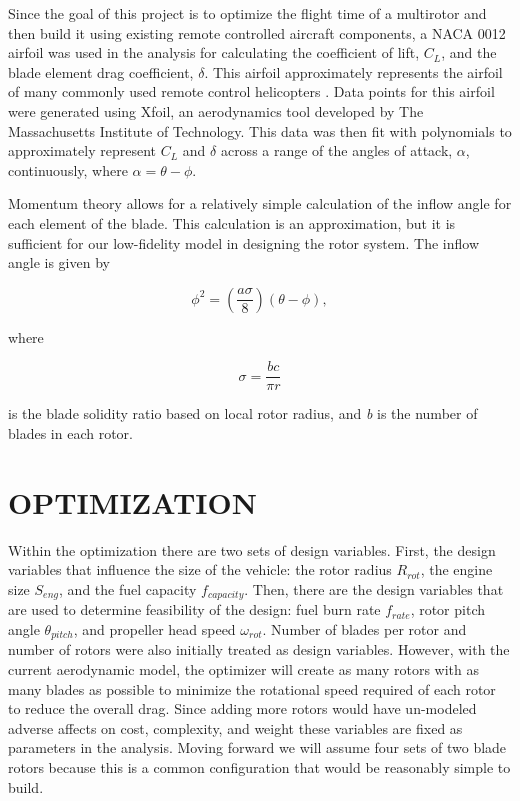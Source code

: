 \documentclass[letterpaper, 10 pt, conference]{ieeeconf}  %
\begin{document}
Since the goal of this project is to optimize the flight time of a multirotor and then build it using existing remote controlled aircraft components, a NACA 0012 airfoil was used in the analysis for calculating the coefficient of lift, $C_L$, and the blade element drag coefficient, $\delta$. This airfoil approximately represents the airfoil of many commonly used remote control helicopters \cite{mettler2013identification}. Data points for this airfoil were generated using Xfoil, an aerodynamics tool developed by The Massachusetts Institute of Technology. This data was then fit with polynomials to approximately represent $C_L$ and $\delta$ across a range of the angles of attack, $\alpha$, continuously, where $\alpha = \theta - \phi$. 

Momentum theory allows for a relatively simple calculation of the inflow angle for each element of the blade. This calculation is an approximation, but it is sufficient for our low-fidelity model in designing the rotor system. The inflow angle is given by 

\begin{equation}
\phi^2 = (\frac{a\sigma}{8})(\theta-\phi),
\label{inflow_eqn}
\end{equation}

where 

\[ \sigma = \frac{bc}{\pi r} \]

is the blade solidity ratio based on local rotor radius, and \textit{b} is the number of blades in each rotor. 


\section{OPTIMIZATION}

Within the optimization there are two sets of design variables.  First, the design variables that influence the size of the vehicle: the rotor radius $R_{rot}$, the engine size $S_{eng}$, and the fuel capacity $f_{capacity}$.  Then, there are the design variables that are used to determine feasibility of the design: fuel burn rate $f_{rate}$, rotor pitch angle $\theta_{pitch}$, and propeller head speed $\omega_{rot}$. Number of blades per rotor and number of rotors were also initially treated as design variables. However, with the current aerodynamic model, the optimizer will create as many rotors with as many blades as possible to minimize the rotational speed required of each rotor to reduce the overall drag. Since adding more rotors would have un-modeled adverse affects on cost, complexity, and weight these variables are fixed as parameters in the analysis. Moving forward we will assume four sets of two blade rotors because this is a common configuration that would be reasonably simple to build.
\end{document}
